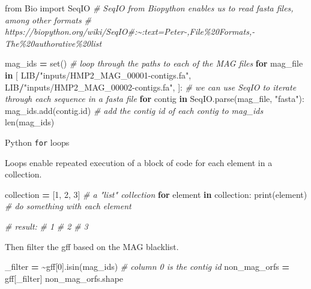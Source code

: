 \documentclass[
]{book}
\newenvironment{Shaded}{\begin{snugshade}}{\end{snugshade}}
\newcommand{\BuiltInTok}[1]{#1}
\newcommand{\CommentTok}[1]{\textcolor[rgb]{0.56,0.35,0.01}{\textit{#1}}}
\newcommand{\ControlFlowTok}[1]{\textcolor[rgb]{0.13,0.29,0.53}{\textbf{#1}}}
\newcommand{\DecValTok}[1]{\textcolor[rgb]{0.00,0.00,0.81}{#1}}
\newcommand{\ImportTok}[1]{#1}
\newcommand{\KeywordTok}[1]{\textcolor[rgb]{0.13,0.29,0.53}{\textbf{#1}}}
\newcommand{\NormalTok}[1]{#1}
\newcommand{\OperatorTok}[1]{\textcolor[rgb]{0.81,0.36,0.00}{\textbf{#1}}}
\newcommand{\StringTok}[1]{\textcolor[rgb]{0.31,0.60,0.02}{#1}}
\begin{document}
\begin{Shaded}
\begin{Highlighting}[numbers=left,,]
\ImportTok{from}\NormalTok{ Bio }\ImportTok{import}\NormalTok{ SeqIO }\CommentTok{\# SeqIO from Biopython enables us to read fasta files, among other formats}
\CommentTok{\# https://biopython.org/wiki/SeqIO\#:\textasciitilde{}:text=Peter{-},File\%20Formats,{-}The\%20authorative\%20list}

\NormalTok{mag\_ids }\OperatorTok{=} \BuiltInTok{set}\NormalTok{()}
\CommentTok{\# loop through the paths to each of the MAG files}
\ControlFlowTok{for}\NormalTok{ mag\_file }\KeywordTok{in}\NormalTok{ [}
\NormalTok{    LIB}\OperatorTok{/}\StringTok{"inputs/HMP2\_MAG\_00001{-}contigs.fa"}\NormalTok{,}
\NormalTok{    LIB}\OperatorTok{/}\StringTok{"inputs/HMP2\_MAG\_00002{-}contigs.fa"}\NormalTok{,}
\NormalTok{]:}
    \CommentTok{\# we can use SeqIO to iterate through each sequence in a fasta file}
    \ControlFlowTok{for}\NormalTok{ contig }\KeywordTok{in}\NormalTok{ SeqIO.parse(mag\_file, }\StringTok{"fasta"}\NormalTok{):}
\NormalTok{        mag\_ids.add(contig.}\BuiltInTok{id}\NormalTok{) }\CommentTok{\# add the contig id of each contig to mag\_ids}
\BuiltInTok{len}\NormalTok{(mag\_ids)}
\end{Highlighting}
\end{Shaded}

Python \texttt{for} loops

Loops enable repeated execution of a block of code for each element in a collection.

\begin{Shaded}
\begin{Highlighting}[numbers=left,,]
\NormalTok{collection }\OperatorTok{=}\NormalTok{ [}\DecValTok{1}\NormalTok{, }\DecValTok{2}\NormalTok{, }\DecValTok{3}\NormalTok{] }\CommentTok{\# a "list" collection}
\ControlFlowTok{for}\NormalTok{ element }\KeywordTok{in}\NormalTok{ collection:}
    \BuiltInTok{print}\NormalTok{(element) }\CommentTok{\# do something with each element}

\CommentTok{\# result:}
\CommentTok{\# 1}
\CommentTok{\# 2}
\CommentTok{\# 3}
\end{Highlighting}
\end{Shaded}

Then filter the gff based on the MAG blacklist.

\begin{Shaded}
\begin{Highlighting}[numbers=left,,]
\NormalTok{\_filter }\OperatorTok{=} \OperatorTok{\textasciitilde{}}\NormalTok{gff[}\DecValTok{0}\NormalTok{].isin(mag\_ids) }\CommentTok{\# column 0 is the contig id}
\NormalTok{non\_mag\_orfs }\OperatorTok{=}\NormalTok{ gff[\_filter]}
\NormalTok{non\_mag\_orfs.shape}
\end{Highlighting}
\end{Shaded}
\end{document}
